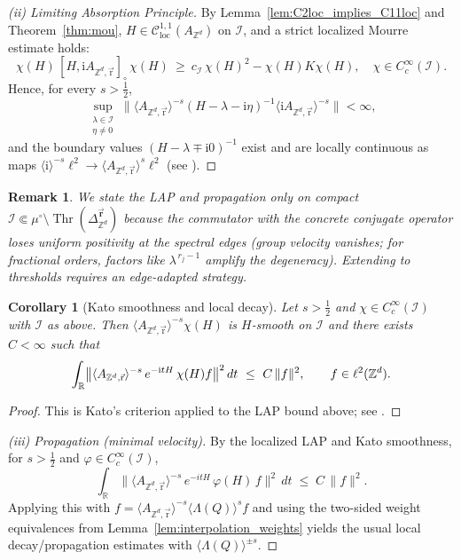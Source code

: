 \documentclass[10pt]{amsart} %
\newcommand{\1}{{\mathbb{I}}}
\newcommand{\Thr}{\operatorname{Thr}}
\numberwithin{equation}{section}
\newtheorem{remark}[theorem]{Remark}%
\newtheorem{corollary}[theorem]{Corollary}%
\begin{document}
\begin{proof}[(ii) Limiting Absorption Principle]
By Lemma~\ref{lem:C2loc_implies_C11loc} and Theorem~\ref{thm:mou}, $H\in\mathcal{C}^{1,1}_{\mathrm{loc}}(A_{\mathbb{Z}^d})$ on $\mathcal{I}$, and a strict localized Mourre estimate holds:
\[
\chi(H)\,[H,\mathrm iA_{\mathbb{Z}^d,\vec{\mathrm{r}}}]_\circ\,\chi(H)\ \ge\ c_{\mathcal{I}}\,\chi(H)^2-\chi(H)K\chi(H),
\quad \chi\in C_c^\infty(\mathcal{I}).
\]
Hence, for every $s>\tfrac12$,
\[
\sup_{\substack{\lambda\in \mathcal{I}\\ \eta\neq 0}}
\big\|\langle A_{\mathbb{Z}^d,\vec{\mathrm{r}}}\rangle^{-s}(H-\lambda-\mathrm i\eta)^{-1}\langle \mathrm iA_{\mathbb{Z}^d,\vec{\mathrm{r}}}\rangle^{-s}\big\|<\infty,
\]
and the boundary values $(H-\lambda\mp\mathrm i0)^{-1}$ exist and are locally continuous as maps
$\langle \mathrm i\rangle^{-s}\ell^2\to\langle  A_{\mathbb{Z}^d,\vec{\mathrm{r}}}\rangle^{s}\ell^2$ (see \cite[Thm.~7.4.1]{ABG}).
\end{proof}
\begin{remark}
We state the LAP and propagation only on compact $\mathcal{I}\Subset \mu^\circ\setminus\Thr(\Delta_{\mathbb{Z}^d}^{\vec{\mathbf{r}}})$ because the commutator with the concrete conjugate operator loses uniform positivity at the spectral edges (group velocity vanishes; for fractional orders, factors like $\lambda^{\,r_j-1}$ amplify the degeneracy). Extending to thresholds requires an edge-adapted strategy.
\end{remark}
\begin{corollary}[Kato smoothness and local decay]\label{cor:local-decay}
Let $s>\tfrac12$ and $\chi\in C_c^\infty(\mathcal{I})$ with $\mathcal{I}$ as above.
Then $\langle A_{\mathbb{Z}^d,\vec{\mathrm{r}}}\rangle^{-s}\chi(H)$ is $H$-smooth on $\mathcal{I}$ and there exists $C<\infty$ such that
\[
\int_{\mathbb{R}}\bigl\|\langle A_{\mathbb{Z}^d,\vec{\mathrm{r}}}\rangle^{-s}\,e^{-{\rm i}tH}\,\chi(H)f\bigr\|^2\,dt\ \le\ C\,\|f\|^2,
\qquad f\in\ell^2(\mathbb{Z}^d).
\]
\end{corollary}

\begin{proof}
This is Kato's criterion applied to the LAP bound above; see \cite[Thm.~7.4.1]{ABG}.
\end{proof}

 \begin{proof}[(iii) Propagation (minimal velocity)]
By the localized LAP and Kato smoothness, for $s>\tfrac12$ and $\varphi\in C_c^\infty(\mathcal{I})$,
\[
\int_{\mathbb{R}}\big\|\langle A_{\mathbb{Z}^d,\vec{\mathrm{r}}}\rangle^{-s}\,e^{-itH}\,\varphi(H)\,f\big\|^2\,dt \;\le\; C\,\|f\|^2.
\]
Applying this with $f=\langle A_{\mathbb{Z}^d,\vec{\mathrm{r}}}\rangle^{-s}\langle \Lambda(Q)\rangle^{s}f$ and using the two-sided weight equivalences from Lemma~\ref{lem:interpolation_weights} yields the usual local decay/propagation estimates with $\langle\Lambda(Q)\rangle^{\pm s}$.
\end{proof}
\end{document}
